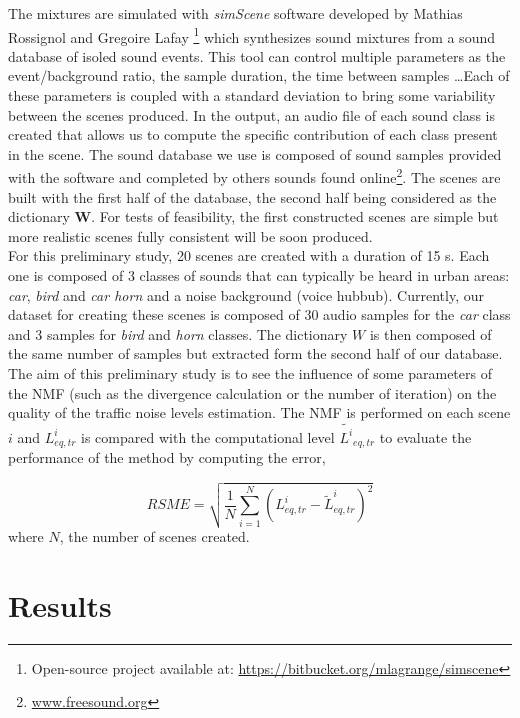 \documentclass{article}
\begin{document}
\begin{sloppy}
The mixtures are simulated with \textit{simScene} software developed by Mathias Rossignol and Gregoire Lafay \cite{simScene}\footnote{Open-source project available at: \url{https://bitbucket.org/mlagrange/simscene}} which synthesizes sound mixtures from a sound database of isoled sound events. This tool can control multiple parameters as the event/background ratio, the sample duration, the time between samples \dots Each of these parameters is coupled with a standard deviation to bring some variability between the scenes produced. In the output, an audio file of each sound class is created that allows us to compute the specific contribution of each class present in the scene. The sound database we use is composed of sound samples provided with the software and completed by others sounds found online\footnote{\url{www.freesound.org}}. The scenes are built with the first half of the database, the second half being considered as the dictionary $\mathbf{W}$. For tests of feasibility, the first constructed scenes are simple but more realistic scenes fully consistent will be soon produced.\\
For this preliminary study, 20 scenes are created with a duration of 15 s. Each one is composed of 3 classes of sounds that can typically be heard in urban areas: \textit{car}, \textit{bird} and \textit{car horn} and a noise background (voice hubbub). Currently, our dataset for creating these scenes is composed of 30 audio samples for the \textit{car} class and 3 samples for \textit{bird} and \textit{horn} classes. The dictionary $W$ is then composed of the same number of samples but extracted form the second half of our database.
The aim of this preliminary study is to see the influence of some parameters of the NMF (such as the divergence calculation or the number of iteration) on the quality of the traffic noise levels estimation. The NMF is performed on each scene $i$ and $L^i_{eq,tr}$ is compared with the computational level $\tilde{L^i}_{eq,tr}$ to evaluate the performance of the method by computing the error,

\begin{equation}
RSME = \sqrt{\frac{1}{N}\sum_{i = 1}^N(L^i_{eq,tr}-\tilde{L}^i_{eq,tr})^2}
\end{equation}
where $N$, the number of scenes created.

\section{Results}\label{sec:results}


\end{sloppy}
\end{document}
